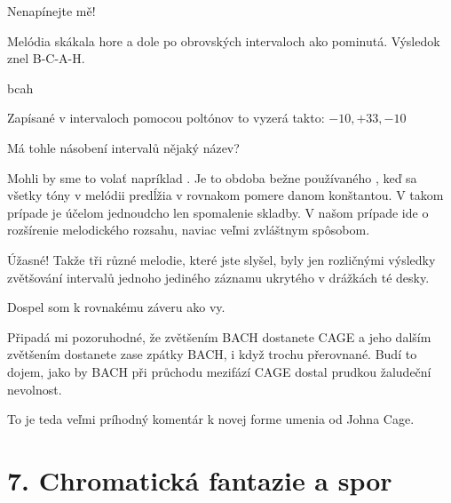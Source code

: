 \documentclass[12pt]{article}
\begin{document}
\begin{description}[itemsep=0pt]
\item[A:] Nenapínejte mě!

\item[Ž:] Melódia skákala hore a dole po obrovských intervaloch ako pominutá. 
    Výsledok znel B-C-A-H.

\item[melodia] bcah

\item[Ž:] Zapísané v intervaloch pomocou poltónov to vyzerá takto: $-10, +33, -10$

\item[A:] Má tohle násobení intervalů nějaký název?

\item[Ž:] Mohli by sme to volať napríklad . Je to obdoba 
    bežne používaného , keď sa všetky tóny v melódii predĺžia 
    v rovnakom pomere danom konštantou. V takom prípade je účelom jednoudcho len 
    spomalenie skladby. V našom prípade ide o rozšírenie melodického rozsahu, naviac 
    veľmi zvláštnym spôsobom.

\item[A:] Úžasné! Takže tři různé melodie, které jste slyšel, byly jen rozličnými
    výsledky zvětšování intervalů jednoho jediného záznamu ukrytého v drážkách té desky.

\item[Ž:] Dospel som k rovnakému záveru ako vy.

\item[A:] Připadá mi pozoruhodné, že zvětšením BACH dostanete CAGE a jeho dalším
    zvětšením dostanete zase zpátky BACH, i když trochu přerovnané.
    Budí to dojem, jako by BACH při průchodu mezifází CAGE dostal prudkou žaludeční
    nevolnost.

\item[Ž:] To je teda veľmi príhodný komentár k novej forme umenia od Johna Cage.

\end{description}

\newpage
\section*{7. Chromatická fantazie a spor}
\end{document}
